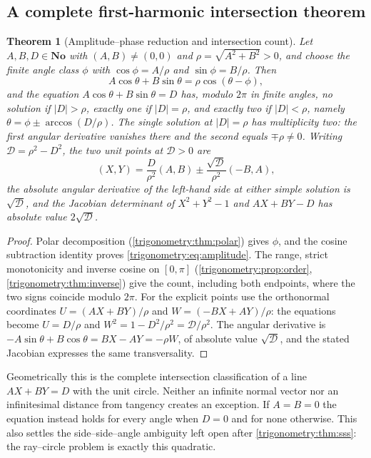 \documentclass[11pt,letterpaper]{article}
\numberwithin{equation}{section}
\newtheorem{theorem}{Theorem}[section]
\theoremstyle{definition}
\theoremstyle{remark}
\newcommand{\No}{\mathbf{No}}
\begin{document}
\subsection{A complete first-harmonic intersection theorem}
\begin{theorem}[Amplitude--phase reduction and intersection count]
\label{trigonometry:thm:amplitude}
Let $A,B,D\in\No$ with $(A,B)\ne(0,0)$ and $\rho=\sqrt{A^2+B^2}>0$, and choose the finite angle
class $\phi$ with $\cos\phi=A/\rho$ and $\sin\phi=B/\rho$. Then
\begin{equation}\label{trigonometry:eq:amplitude}
 A\cos\theta+B\sin\theta=\rho\cos(\theta-\phi),
\end{equation}
and the equation $A\cos\theta+B\sin\theta=D$ has, modulo $2\pi$ in finite angles, no solution if
$|D|>\rho$, exactly one if $|D|=\rho$, and exactly two if $|D|<\rho$, namely
$\theta=\phi\pm\arccos(D/\rho)$. The single solution at $|D|=\rho$ has multiplicity two: the first
angular derivative vanishes there and the second equals $\mp\rho\ne0$. Writing
$\mathcal D=\rho^2-D^2$, the two unit points at $\mathcal D>0$ are
\begin{equation}\label{trigonometry:eq:intersectionpoints}
 (X,Y)=\frac D{\rho^2}(A,B)\pm\frac{\sqrt{\mathcal D}}{\rho^2}(-B,A),
\end{equation}
the absolute angular derivative of the left-hand side at either simple solution is
$\sqrt{\mathcal D}$, and the Jacobian determinant of $X^2+Y^2-1$ and $AX+BY-D$ has absolute value
$2\sqrt{\mathcal D}$.
\end{theorem}
\begin{proof}
Polar decomposition (\cref{trigonometry:thm:polar}) gives $\phi$, and the cosine subtraction
identity proves \cref{trigonometry:eq:amplitude}. The range, strict monotonicity and inverse cosine
on $[0,\pi]$ (\cref{trigonometry:prop:order}, \cref{trigonometry:thm:inverse}) give the count,
including both endpoints, where the two signs coincide modulo $2\pi$. For the explicit points use
the orthonormal coordinates $U=(AX+BY)/\rho$ and $W=(-BX+AY)/\rho$: the equations become
$U=D/\rho$ and $W^2=1-D^2/\rho^2=\mathcal D/\rho^2$. The angular derivative is
$-A\sin\theta+B\cos\theta=BX-AY=-\rho W$, of absolute value $\sqrt{\mathcal D}$, and the stated
Jacobian expresses the same transversality.
\end{proof}
Geometrically this is the complete intersection classification of a line $AX+BY=D$ with the unit
circle. Neither an infinite normal vector nor an infinitesimal distance from tangency creates an
exception. If $A=B=0$ the equation instead holds for every angle when $D=0$ and for none
otherwise. This also settles the side--side--angle ambiguity left open after
\cref{trigonometry:thm:sss}: the ray--circle problem is exactly this quadratic.
\end{document}
